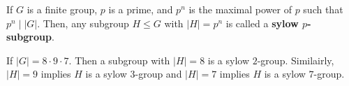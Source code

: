 \begin{definition}
	If \(G\) is a finite group, \(p\) is a prime, and \(p^{n}\) is the maximal power of \(p\) such that \(p^{n} \mid \left| G \right| \). Then, any subgroup \(H \le G\) with \(\left| H \right| = p^{n}\) is called a \textbf{sylow \(p\)-subgroup}.
\end{definition}
\begin{example}
	If \(\left| G \right| = 8\cdot 9 \cdot 7\). Then a subgroup with  \(\left| H \right| = 8\)  is a sylow \(2\)-group. Similairly, \(\left| H \right| = 9\) implies \(H\) is a sylow \(3\)-group and \(\left| H \right| = 7\) implies \(H\) is a sylow \(7\)-group.
\end{example}
